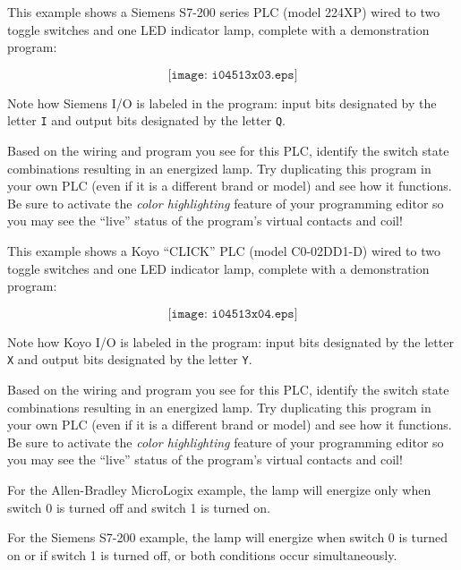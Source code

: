 \filbreak

This example shows a Siemens S7-200 series PLC (model 224XP) wired to two toggle switches and one LED indicator lamp, complete with a demonstration program:

$$\texttt{[image: i04513x03.eps]}$$

Note how Siemens I/O is labeled in the program: input bits designated by the letter {\tt I} and output bits designated by the letter {\tt Q}.

Based on the wiring and program you see for this PLC, identify the switch state combinations resulting in an energized lamp.  Try duplicating this program in your own PLC (even if it is a different brand or model) and see how it functions.  Be sure to activate the {\it color highlighting} feature of your programming editor so you may see the ``live'' status of the program's virtual contacts and coil!

\filbreak

This example shows a Koyo ``CLICK'' PLC (model C0-02DD1-D) wired to two toggle switches and one LED indicator lamp, complete with a demonstration program:

$$\texttt{[image: i04513x04.eps]}$$

Note how Koyo I/O is labeled in the program: input bits designated by the letter {\tt X} and output bits designated by the letter {\tt Y}.

Based on the wiring and program you see for this PLC, identify the switch state combinations resulting in an energized lamp.  Try duplicating this program in your own PLC (even if it is a different brand or model) and see how it functions.  Be sure to activate the {\it color highlighting} feature of your programming editor so you may see the ``live'' status of the program's virtual contacts and coil!










For the Allen-Bradley MicroLogix example, the lamp will energize only when switch 0 is turned off and switch 1 is turned on.

\vskip 10pt

For the Siemens S7-200 example, the lamp will energize when switch 0 is turned on or if switch 1 is turned off, or both conditions occur simultaneously.

